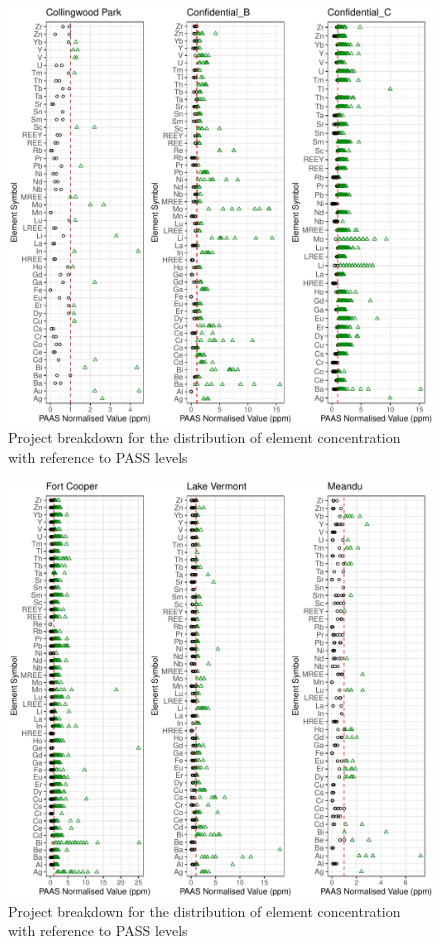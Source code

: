 \documentclass[11pt,a4paper,]{article}
\begin{document}
\begin{figure}
\includegraphics[width=1\linewidth,height=1\textheight]{Final_report_files/figure-latex/regionalbk1-1} \caption{Project breakdown for the distribution of element concentration with reference to PASS levels}\label{fig:regionalbk1}
\end{figure}

\newpage

\begin{figure}
\includegraphics[width=1\linewidth,height=1\textheight]{Final_report_files/figure-latex/regionalbk2-1} \caption{Project breakdown for the distribution of element concentration with reference to PASS levels}\label{fig:regionalbk2}
\end{figure}
\end{document}
